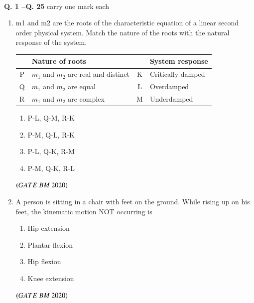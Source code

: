 \documentclass[journal,12pt,onecolumn]{IEEEtran}
\theoremstyle{remark}
\begin{document}
 \newpage
{}\\
  \noindent \textbf{Q. 1 --Q.  \textbf{25}} carry one mark each
\begin{enumerate}

\item m1 and m2 are the roots of the characteristic equation of a linear second order physical system. Match the nature of the roots with the natural response of the system.\\

\begin{center}
\begin{tabular}{|c|l|c|l|}
\hline
\textbf{} & \textbf{Nature of roots} & \textbf{} & \textbf{System response} \\
\hline
P & $m_1$ and $m_2$ are real and distinct & K & Critically damped \\
\hline
Q & $m_1$ and $m_2$ are equal & L & Overdamped \\
\hline
R & $m_1$ and $m_2$ are complex & M & Underdamped \\
\hline
\end{tabular}
\end{center}

\begin{enumerate}
\item\hspace{0.5cm}P-L, Q-M, R-K
\item\hspace{0.5cm}P-M, Q-L, R-K
\item\hspace{0.5cm}P-L, Q-K, R-M
\item\hspace{0.5cm}P-M, Q-K, R-L
\end{enumerate}
 \hfill $\brak{GATE\ BM\ 2020}$\\

\item A person is sitting in a chair with feet on the ground. While rising up on his feet, the kinematic motion NOT occurring is
\begin{enumerate}[label=\alph*)]
\item\hspace{0.5cm}Hip extension
\item\hspace{0.5cm}Plantar flexion
\item\hspace{0.5cm}Hip flexion
\item\hspace{0.5cm}Knee extension
\end{enumerate}
 \hfill $\brak{GATE\ BM\ 2020}$\\
 

\end{enumerate}
\end{document}
